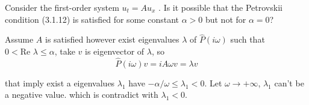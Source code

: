 \exc Consider the first-order system 
$u_t = Au_x$ . Is it possible that the Petrovskii
condition (3.1.12)
 is satisfied for some constant 
 $\alpha > 0$ but not for $\alpha = 0$?


\begin{solution}
    Assume $A$ is satisfied
    however exist eigenvalues $\lambda$ of 
    $\hat{P}(i\omega)$ such that 
    $0 < \text{Re } \lambda \leq \alpha$, take $v$ is 
    eigenvector of $\lambda$, so 
    \[\hat{P}(i \omega)v = i A \omega v = \lambda v\]

    that imply exist a eigenvalues $\lambda_1$
    have $ - \alpha / \omega \leq \lambda_1 < 0$. 
    Let $\omega \rightarrow + \infty  $, $\lambda_1$
    can't be a negative value. which is contradict with 
    $\lambda_1 < 0$.
\end{solution}